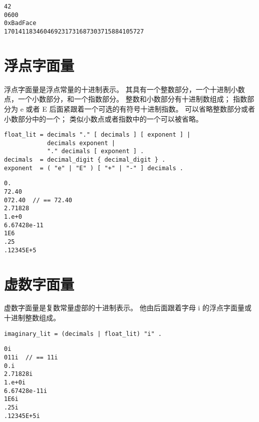 \begin{lstlisting}[style=golang]
42
0600
0xBadFace
170141183460469231731687303715884105727
\end{lstlisting}


\section{浮点字面量}
浮点字面量是浮点常量的十进制表示。
其具有一个整数部分，一个十进制小数点，一个小数部分，和一个指数部分。
整数和小数部分有十进制数组成；
指数部分为 e 或者 E 后面紧跟着一个可选的有符号十进制指数。
可以省略整数部分或者小数部分中的一个；
类似小数点或者指数中的一个可以被省略。
\begin{lstlisting}[style=golang]
float_lit = decimals "." [ decimals ] [ exponent ] |
            decimals exponent |
            "." decimals [ exponent ] .
decimals  = decimal_digit { decimal_digit } .
exponent  = ( "e" | "E" ) [ "+" | "-" ] decimals .
\end{lstlisting}

\begin{lstlisting}[style=golang]
0.
72.40
072.40  // == 72.40
2.71828
1.e+0
6.67428e-11
1E6
.25
.12345E+5
\end{lstlisting}

\section{虚数字面量}
虚数字面量是复数常量虚部的十进制表示。
他由后面跟着字母 i 的浮点字面量或十进制整数组成。
\begin{lstlisting}[style=EBNF]
imaginary_lit = (decimals | float_lit) "i" .
\end{lstlisting}

\begin{lstlisting}[style=golang]
0i
011i  // == 11i
0.i
2.71828i
1.e+0i
6.67428e-11i
1E6i
.25i
.12345E+5i
\end{lstlisting}



